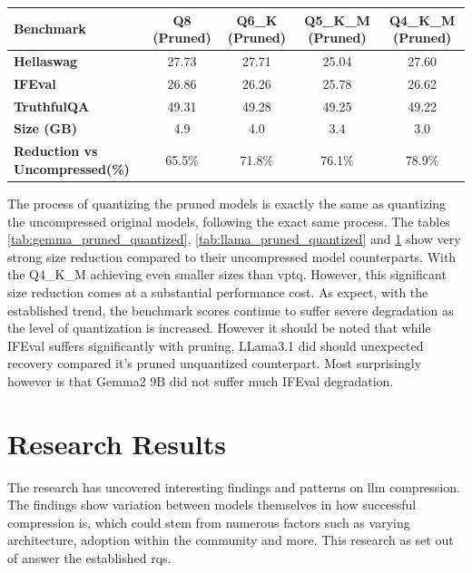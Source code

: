 \documentclass{ifacconf}
\begin{document}
\begin{strip}
\begin{minipage}{\textwidth}
            \begin{table}[H]
                \centering
                \begin{tabular}{|l|c|c|c|c|}
                    \hline
                    \textbf{Benchmark} & \textbf{Q8 (Pruned)} & \textbf{Q6\_K (Pruned)} & \textbf{Q5\_K\_M (Pruned)} & \textbf{Q4\_K\_M (Pruned)} \\ \hline
                    \textbf{Hellaswag} & 27.73 & 27.71 & 25.04 & 27.60 \\ \hline
                    \textbf{IFEval}    & 26.86 & 26.26 & 25.78 & 26.62 \\ \hline
                    \textbf{TruthfulQA} & 49.31 & 49.28 & 49.25 & 49.22 \\ \hline
                    \textbf{Size (GB)} & 4.9 & 4.0 & 3.4 & 3.0 \\ \hline
                    \textbf{Reduction vs Uncompressed(\%)} & 65.5\% & 71.8\% & 76.1\% & 78.9\% \\ \hline
                \end{tabular}
                \label{tab:qwen_pruned_quantized}
            \end{table}
		\end{minipage}
	\end{strip}
    
    The process of quantizing the pruned models is exactly the same as quantizing the uncompressed original models, following the exact same process. The tables \ref{tab:gemma_pruned_quantized}, \ref{tab:llama_pruned_quantized} and \ref{tab:qwen_pruned_quantized} show very strong size reduction compared to their uncompressed model counterparts. With the Q4\_K\_M achieving even smaller sizes than \gls{vptq}. However, this significant size reduction comes at a substantial performance cost. As expect, with the established trend, the benchmark scores continue to suffer severe degradation as the level of quantization is increased. However it should be noted that while IFEval suffers significantly with pruning, LLama3.1 did should unexpected recovery compared it's pruned unquantized counterpart. Most surprisingly however is that Gemma2 9B did not suffer much IFEval degradation.

    \section{Research Results}
    The research has uncovered interesting findings and patterns on \gls{llm} compression. The findings show variation between models themselves in how successful compression is, which could stem from numerous factors such as varying architecture, adoption within the community and more. This research as set out of answer the established \glspl{rq}. 
\end{document}
